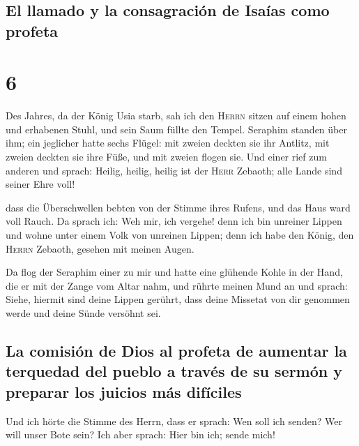 \hypertarget{el-llamado-y-la-consagraciuxf3n-de-isauxedas-como-profeta}{%
\subsection{El llamado y la consagración de Isaías como
profeta}\label{el-llamado-y-la-consagraciuxf3n-de-isauxedas-como-profeta}}

\hypertarget{section-5}{%
\section{6}\label{section-5}}

 Des Jahres, da der König Usia starb, sah ich den
\textsc{Herrn} sitzen auf einem hohen und erhabenen Stuhl, und sein Saum
füllte den Tempel.  Seraphim standen über ihm; ein
jeglicher hatte sechs Flügel: mit zweien deckten sie ihr Antlitz, mit
zweien deckten sie ihre Füße, und mit zweien flogen sie. 
Und einer rief zum anderen und sprach: Heilig, heilig, heilig ist der
\textsc{Herr} Zebaoth; alle Lande sind seiner Ehre voll!

 dass die Überschwellen bebten von der Stimme ihres
Rufens, und das Haus ward voll Rauch.  Da sprach ich: Weh
mir, ich vergehe! denn ich bin unreiner Lippen und wohne unter einem
Volk von unreinen Lippen; denn ich habe den König, den \textsc{Herrn}
Zebaoth, gesehen mit meinen Augen.

 Da flog der Seraphim einer zu mir und hatte eine glühende
Kohle in der Hand, die er mit der Zange vom Altar nahm, 
und rührte meinen Mund an und sprach: Siehe, hiermit sind deine Lippen
gerührt, dass deine Missetat von dir genommen werde und deine Sünde
versöhnt sei.

\hypertarget{la-comisiuxf3n-de-dios-al-profeta-de-aumentar-la-terquedad-del-pueblo-a-travuxe9s-de-su-sermuxf3n-y-preparar-los-juicios-muxe1s-difuxedciles}{%
\subsection{La comisión de Dios al profeta de aumentar la terquedad del
pueblo a través de su sermón y preparar los juicios más
difíciles}\label{la-comisiuxf3n-de-dios-al-profeta-de-aumentar-la-terquedad-del-pueblo-a-travuxe9s-de-su-sermuxf3n-y-preparar-los-juicios-muxe1s-difuxedciles}}

 Und ich hörte die Stimme des Herrn, dass er sprach: Wen
soll ich senden? Wer will unser Bote sein? Ich aber sprach: Hier bin
ich; sende mich!

